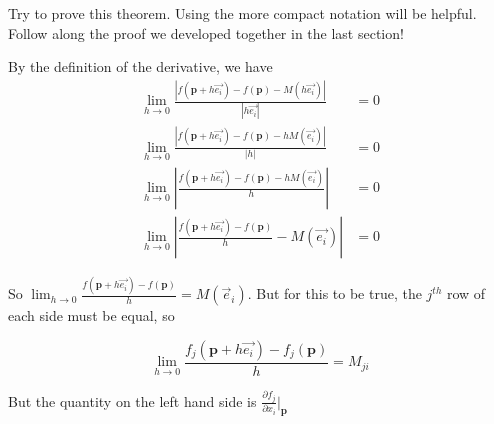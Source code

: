 \documentclass{ximera}
\begin{document}
	Try to prove this theorem.  Using the more compact notation will be helpful.  Follow along the proof we developed together in the last section!
	\begin{free-response}
		By the definition of the derivative,  we have 
		\begin{align*}
		 \lim_{h \to 0} \frac{\left| f(\mathbf{p}+h\vec{e_i}) - f(\mathbf{p}) - M(h\vec{e_i}) \right|}{\left| h\vec{e_i}\right|} &= 0\\
		 \lim_{h \to 0} \frac{\left| f(\mathbf{p}+h\vec{e_i}) - f(\mathbf{p}) - hM(\vec{e_i}) \right|}{|h|} &= 0\\
		 \lim_{h \to 0} \left| \frac{f(\mathbf{p}+h\vec{e_i}) - f(\mathbf{p}) - hM(\vec{e_i})}{h} \right|&= 0\\
		  \lim_{h \to 0} \left| \frac{f(\mathbf{p}+h\vec{e_i}) - f(\mathbf{p})}{h} - M(\vec{e_i}) \right|&= 0
		 \end{align*}
		 
		 So $\displaystyle\lim_{h \to 0}  \frac{f(\mathbf{p}+h\vec{e_i}) - f(\mathbf{p})}{h}  = M (\vec{e}_i)$.  But for this to be true, the $j^{th}$ row of each side must be equal, so 
		 
		\[\displaystyle\lim_{h \to 0}  \frac{f_j(\mathbf{p}+h\vec{e_i}) - f_j(\mathbf{p})}{h}  = M _{ji}\]
		
		But the quantity on the left hand side is $\frac{\partial f_j}{\partial x_i}\big|_{\mathbf{p}}$
	\end{free-response}
	
\end{document}
